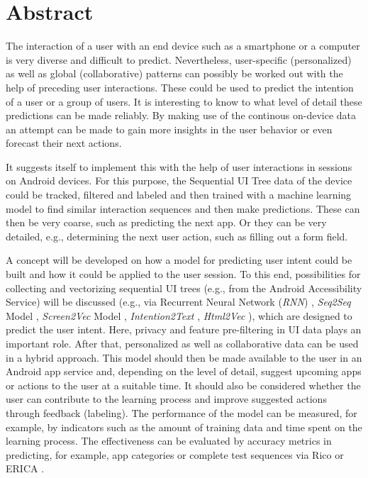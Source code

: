 \section*{Abstract}
\label{sec:abstract}

The interaction of a user with an end device such as a smartphone or a computer is very diverse and difficult to predict. Nevertheless, user-specific (personalized) as well as global (collaborative) patterns can possibly be worked out with the help of preceding user interactions. These could be used to predict the intention of a user or a group of users. It is interesting to know to what level of detail these predictions can be made reliably.
By making use of the continous on-device data an attempt can be made to gain more insights in the user behavior or even forecast their next actions.

It suggests itself to implement this with the help of user interactions in sessions on Android devices. For this purpose, the Sequential UI Tree data of the device could be tracked, filtered and labeled and then trained with a machine learning model to find similar interaction sequences and then make predictions. These can then be very coarse, such as predicting the next app. Or they can be very detailed, e.g., determining the next user action, such as filling out a form field.

A concept will be developed on how a model for predicting user intent could be built and how it could be applied to the user session. To this end, possibilities for collecting and vectorizing sequential UI trees (e.g., from the Android Accessibility Service) will be discussed (e.g., via Recurrent Neural Network (\textit{RNN}) \cite{quadrana2017personalizing} \cite{bansal2022remembering} \cite{pietro2022recommendationSystems}, \textit{Seq2Seq} Model \cite{chollet2017seq2seq},
\textit{Screen2Vec} Model \cite{li2021screen2vec}, 
\textit{Intention2Text} \cite{yu2020understanding}, \textit{Html2Vec} \cite{wu2022distributed}), which are designed to predict the user intent. Here, privacy and feature pre-filtering in UI data plays an important role. After that, personalized as well as collaborative data can be used in a hybrid approach. This model should then be made available to the user in an Android app service and, depending on the level of detail, suggest upcoming apps or actions to the user at a suitable time. It should also be considered whether the user can contribute to the learning process and improve suggested actions through feedback (labeling).
The performance of the model can be measured, for example, by indicators such as the amount of training data and time spent on the learning process. The effectiveness can be evaluated by accuracy metrics in predicting, for example, app categories \cite{google2023appCategory} or complete test sequences via Rico \cite{deka2017rico} or ERICA \cite{deka2016erica}.

